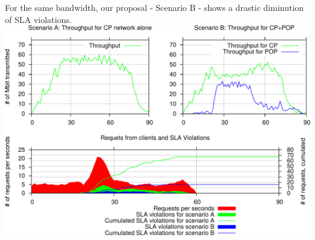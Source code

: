\documentclass[a4paper]{beamer}
\begin{document}
\begin{frame}{For the same bandwidth, our proposal - Scenario B - shows a drastic diminution of SLA violations.}
	\includegraphics[width=0.90\linewidth]{CP+POP_evaluation.pdf}
\end{frame}
\end{document}
